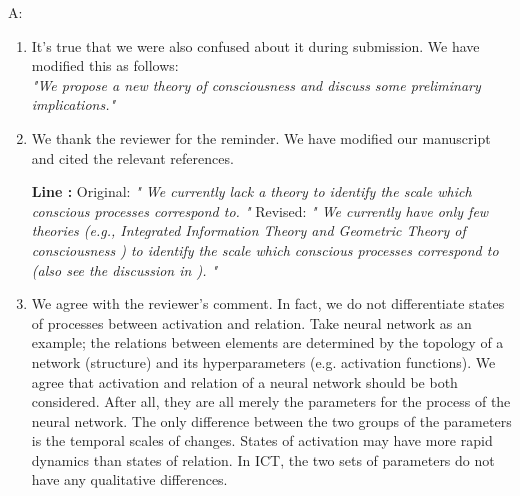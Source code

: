 \documentclass[utf8]{article}
\newenvironment{ans}  
    {\color{Black}\noindent A:}
    {~\newline}
\newcommand{\revise}[3]{
	\newline
	\newline
    \noindent
    \textbf{Line #1:}
    \newline
    Original:\newline
    \textit{"#2"}
    \newline
    \newline
    Revised:\newline
    \textit{"#3"}\newline}
\begin{document}
    	\begin{ans}
    		\begin{enumerate}
    			\item It's true that we were also confused about it during submission. 
    			We have modified this as follows: \\
    			\textit{"We propose a new theory of consciousness and discuss some preliminary implications."}

    			
    			\item We thank the reviewer for the reminder. We have modified our manuscript and cited the relevant references. 
    			\revise{}
    			{
    			We currently lack a theory to identify the scale which conscious processes correspond to.
    			}
    			{
    			We currently have only few theories (e.g., Integrated Information Theory \citep{hoel2016can} and Geometric Theory of consciousness \citep{fekete2011towards,fekete2012lack}) to identify the scale which conscious processes correspond to (also see the discussion in \cite{fekete2016system}).
    			}    			
    			
    			\item We agree with the reviewer's comment. 
                In fact, we do not differentiate states of processes between activation and relation. Take neural network as an example; the relations between elements are determined by the topology of a network (structure) and its hyperparameters (e.g. activation functions). We agree that activation and relation of a neural network should be both considered. After all, they are all merely the parameters for the process of the neural network. The only difference between the two groups of the parameters is the temporal scales of changes. States of activation may have more rapid dynamics than states of relation. In ICT, the two sets of parameters do not have any qualitative differences. 
    			
    		\end{enumerate}
    		
    	\end{ans}
        
        
\end{document}
